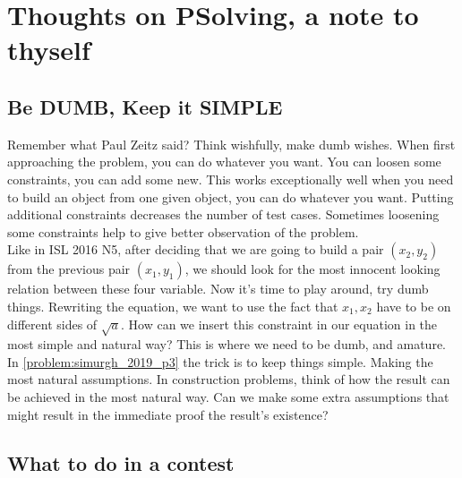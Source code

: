 \chapter{Thoughts on PSolving, a note to thyself}
\thispagestyle{empty}
\section{Be DUMB, Keep it SIMPLE} 

Remember what Paul Zeitz said? Think wishfully, make dumb wishes. When first approaching the problem, you can do whatever you want. You can loosen some constraints, you can add some new. This works exceptionally well when you need to build an object from one given object, you can do whatever you want. Putting additional constraints decreases the number of test cases. Sometimes loosening some constraints help to give better observation of the problem. \\


Like in ISL 2016 N5, after deciding that we are going to build a pair $ (x_2, y_2) $ from the previous pair $ (x_1, y_1) $, we should look for the most innocent looking relation between these four variable. Now it's time to play around, try dumb things. Rewriting the equation, we want to use the fact that $ x_1, x_2 $ have to be on different sides of $ \sqrt{a} $. How can we insert this constraint in our equation in the most simple and natural way? This is where we need to be dumb, and amature.\\


In \autoref{problem:simurgh_2019_p3} the trick is to keep things simple. Making the most natural assumptions. In construction problems, think of how the result can be achieved in the most natural way. Can we make some extra assumptions that might result in the immediate proof the result's existence? 


\newpage
\section*{What to do in a contest}


